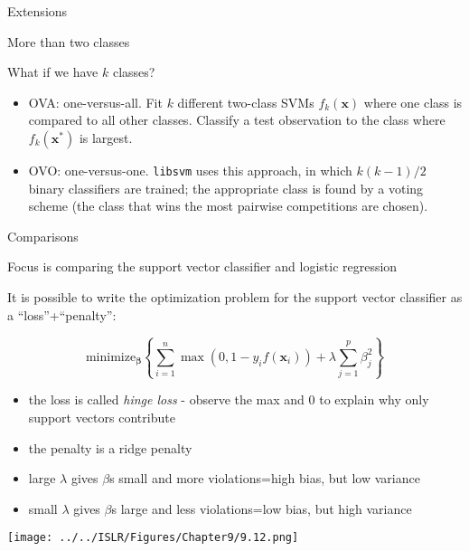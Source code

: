 \documentclass[10pt,ignorenonframetext,]{beamer}
\providecommand{\tightlist}{%
  \setlength{\itemsep}{0pt}\setlength{\parskip}{0pt}}
\begin{document}
\begin{frame}[fragile]{Extensions}

\begin{block}{More than two classes}

What if we have \(k\) classes?

\begin{itemize}
\tightlist
\item
  OVA: one-versus-all. Fit \(k\) different two-class SVMs
  \(f_k({\boldsymbol x})\) where one class is compared to all other
  classes. Classify a test observation to the class where
  \(f_k({\boldsymbol x}^*)\) is largest.
\item
  OVO: one-versus-one. \texttt{libsvm} uses this approach, in which
  \(k(k-1)/2\) binary classifiers are trained; the appropriate class is
  found by a voting scheme (the class that wins the most pairwise
  competitions are chosen).
\end{itemize}

\end{block}

\end{frame}

\begin{frame}{Comparisons}

Focus is comparing the support vector classifier and logistic regression

It is possible to write the optimization problem for the support vector
classifier as a ``loss''+``penalty'':

\[\text{minimize}_{\boldsymbol \beta} \left\{ \sum_{i=1}^n \max(0,1-y_i f({\boldsymbol x}_i))+ \lambda \sum_{j=1}^p \beta_j^2 \right\}\]

\begin{itemize}
\item
  the loss is called \emph{hinge loss} - observe the max and 0 to
  explain why only support vectors contribute
\item
  the penalty is a ridge penalty
\item
  large \(\lambda\) gives \(\beta\)s small and more violations=high
  bias, but low variance
\item
  small \(\lambda\) gives \(\beta\)s large and less violations=low bias,
  but high variance
\end{itemize}

\end{frame}

\begin{frame}

\texttt{[image: ../../ISLR/Figures/Chapter9/9.12.png]}

\end{frame}
\end{document}

